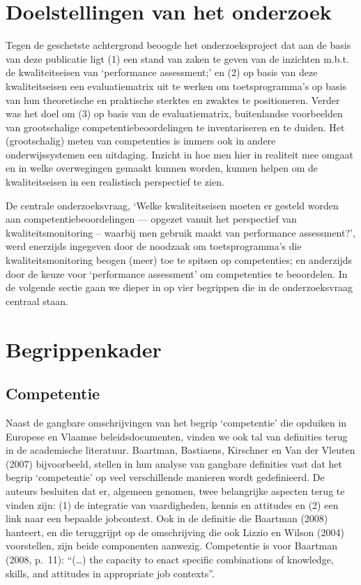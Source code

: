 \documentclass[
  letterpaper,
]{report}
\begin{document}
\hypertarget{doelstellingen-van-het-onderzoek}{%
\section{Doelstellingen van het
onderzoek}\label{doelstellingen-van-het-onderzoek}}

Tegen de geschetste achtergrond beoogde het onderzoeksproject dat aan de
basis van deze publicatie ligt (1) een stand van zaken te geven van de
inzichten m.b.t. de kwaliteitseisen van `performance assessment;' en (2)
op basis van deze kwaliteitseisen een evaluatiematrix uit te werken om
toetsprogramma's op basis van hun theoretische en praktische sterktes en
zwaktes te positioneren. Verder was het doel om (3) op basis van de
evaluatiematrix, buitenlandse voorbeelden van grootschalige
competentiebeoordelingen te inventariseren en te duiden. Het
(grootschalig) meten van competenties is immers ook in andere
onderwijssystemen een uitdaging. Inzicht in hoe men hier in realiteit
mee omgaat en in welke overwegingen gemaakt kunnen worden, kunnen helpen
om de kwaliteitseisen in een realistisch perspectief te zien.

De centrale onderzoeksvraag, `Welke kwaliteitseisen moeten er gesteld
worden aan competentiebeoordelingen --- opgezet vanuit het perspectief
van kwaliteitsmonitoring -- waarbij men gebruik maakt van performance
assessment?', werd enerzijds ingegeven door de noodzaak om
toetsprogramma's die kwaliteitsmonitoring beogen (meer) toe te spitsen
op competenties; en anderzijds door de keuze voor `performance
assessment' om competenties te beoordelen. In de volgende sectie gaan we
dieper in op vier begrippen die in de onderzoeksvraag centraal staan.

\hypertarget{begrippenkader}{%
\section{Begrippenkader}\label{begrippenkader}}

\hypertarget{sec-competentie}{%
\subsection{Competentie}\label{sec-competentie}}

Naast de gangbare omschrijvingen van het begrip `competentie' die
opduiken in Europese en Vlaamse beleidsdocumenten, vinden we ook tal van
definities terug in de academische literatuur. Baartman, Bastiaens,
Kirschner en Van der Vleuten (2007) bijvoorbeeld, stellen in hun analyse
van gangbare definities vast dat het begrip `competentie' op veel
verschillende manieren wordt gedefinieerd. De auteurs besluiten dat er,
algemeen genomen, twee belangrijke aspecten terug te vinden zijn: (1) de
integratie van vaardigheden, kennis en attitudes en (2) een link naar
een bepaalde jobcontext. Ook in de definitie die Baartman (2008)
hanteert, en die teruggrijpt op de omschrijving die ook Lizzio en Wilson
(2004) voorstellen, zijn beide componenten aanwezig. Competentie is voor
Baartman (2008, p.~11): ``(\ldots) the capacity to enact specific
combinations of knowledge, skills, and attitudes in appropriate job
contexts''.
\end{document}
